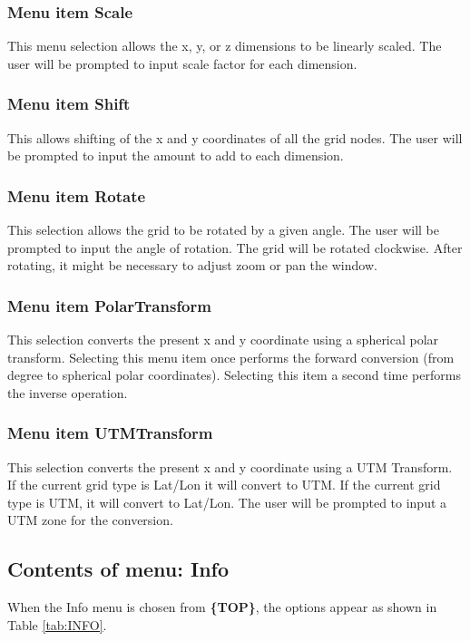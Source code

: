 \documentclass{article}
\begin{document}
\subsubsection{Menu item Scale}
This menu selection allows the x, y, or z dimensions to be linearly scaled. The user will be prompted to input scale factor for each dimension. 

\subsubsection[Menu item Shift]{Menu item Shift}
This allows shifting of the x and y coordinates of all the grid nodes. The user will be prompted to input the amount to add to each dimension.

\subsubsection{Menu item Rotate}
This selection allows the grid to be rotated by a given angle. The user will be prompted to input the angle of rotation. The grid will be rotated clockwise. After rotating, it might be necessary to adjust zoom or pan the window. 

\subsubsection{Menu item PolarTransform}
This selection converts the present x and y coordinate using a spherical polar transform.  Selecting this menu item once performs the forward conversion (from degree to spherical polar coordinates).  Selecting this item a second time performs the inverse operation.

\subsubsection{Menu item UTMTransform}
This selection converts the present x and y coordinate using a UTM Transform. If the current grid type is Lat/Lon it will convert to UTM. If the current grid type is UTM, it will convert to Lat/Lon. The user will be prompted to input a UTM zone for the conversion.


\subsection{Contents of menu: Info}
When the Info menu is chosen from \textbf{\{TOP\}}, the options appear as shown in Table \ref{tab:INFO}.
\end{document}
